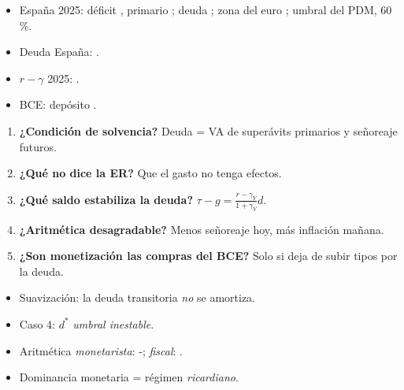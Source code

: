 \documentclass{article}
\begin{document}
\begin{columnas}
\anexorepaso
{}
\begin{itemize}
\item España 2025: déficit , primario ; deuda ; zona del euro ; umbral del PDM, 60\,\%.
\item Deuda España: .
\item $r-\gamma$ 2025: .
\item BCE: depósito .
\end{itemize}
\begin{enumerate}
\item \textbf{¿Condición de solvencia?} Deuda = VA de superávits primarios y señoreaje futuros.
\item \textbf{¿Qué no dice la ER?} Que el gasto no tenga efectos.
\item \textbf{¿Qué saldo estabiliza la deuda?} $\tau-g=\frac{r-\gamma_Y}{1+\gamma_Y}d$.
\item \textbf{¿Aritmética desagradable?} Menos señoreaje hoy, más inflación mañana.
\item \textbf{¿Son monetización las compras del BCE?} Solo si deja de subir tipos por la deuda.
\end{enumerate}
\begin{trampa}
\begin{itemize}
\item Suavización: la deuda transitoria \emph{no} se amortiza.
\item Caso 4: $d^*$ \emph{umbral inestable}.
\item Aritmética \emph{monetarista}: -; \emph{fiscal}: .
\item Dominancia monetaria = régimen \emph{ricardiano}.
\end{itemize}
\end{trampa}

\end{columnas}
\end{document}
